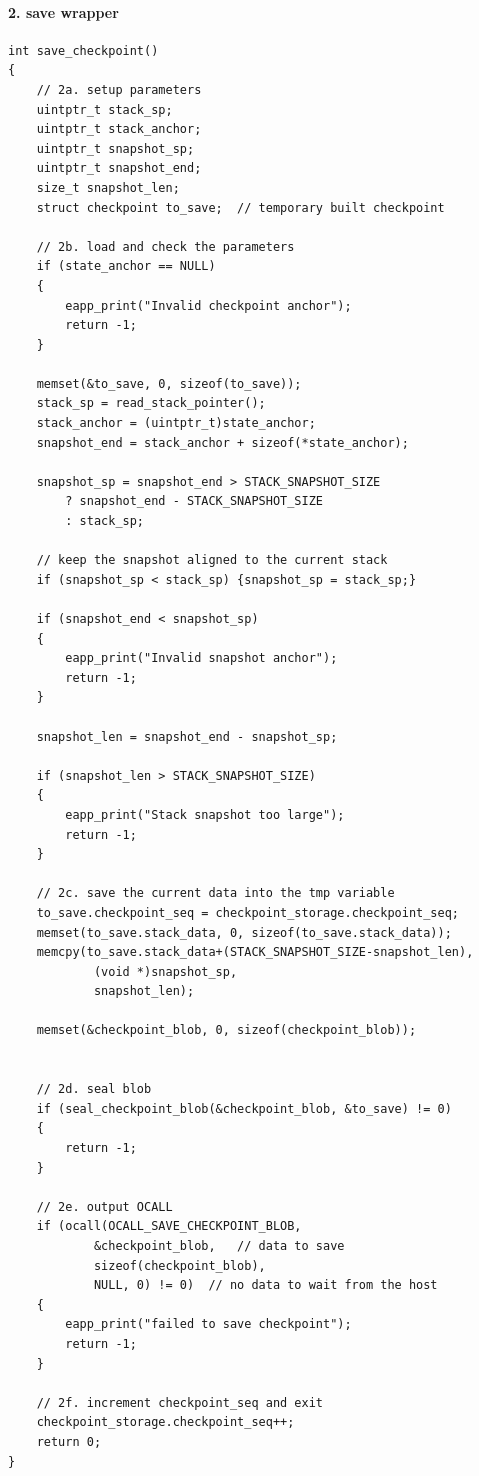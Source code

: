 \documentclass[11pt,a4paper]{report}
\begin{document}
\paragraph{2. save wrapper}
\begin{verbatim}
int save_checkpoint()
{
    // 2a. setup parameters
    uintptr_t stack_sp;
    uintptr_t stack_anchor;
    uintptr_t snapshot_sp;
    uintptr_t snapshot_end;
    size_t snapshot_len;
    struct checkpoint to_save;  // temporary built checkpoint

    // 2b. load and check the parameters
    if (state_anchor == NULL)
    {
        eapp_print("Invalid checkpoint anchor");
        return -1;
    }

    memset(&to_save, 0, sizeof(to_save));
    stack_sp = read_stack_pointer();
    stack_anchor = (uintptr_t)state_anchor;
    snapshot_end = stack_anchor + sizeof(*state_anchor);

    snapshot_sp = snapshot_end > STACK_SNAPSHOT_SIZE
        ? snapshot_end - STACK_SNAPSHOT_SIZE
        : stack_sp;

    // keep the snapshot aligned to the current stack
    if (snapshot_sp < stack_sp) {snapshot_sp = stack_sp;}

    if (snapshot_end < snapshot_sp)
    {
        eapp_print("Invalid snapshot anchor");
        return -1;
    }

    snapshot_len = snapshot_end - snapshot_sp;

    if (snapshot_len > STACK_SNAPSHOT_SIZE)
    {
        eapp_print("Stack snapshot too large");
        return -1;
    }

    // 2c. save the current data into the tmp variable
    to_save.checkpoint_seq = checkpoint_storage.checkpoint_seq;
    memset(to_save.stack_data, 0, sizeof(to_save.stack_data));
    memcpy(to_save.stack_data+(STACK_SNAPSHOT_SIZE-snapshot_len),
            (void *)snapshot_sp,
            snapshot_len);

    memset(&checkpoint_blob, 0, sizeof(checkpoint_blob));


    // 2d. seal blob
    if (seal_checkpoint_blob(&checkpoint_blob, &to_save) != 0)
    {
        return -1;
    }

    // 2e. output OCALL
    if (ocall(OCALL_SAVE_CHECKPOINT_BLOB, 
            &checkpoint_blob,   // data to save
            sizeof(checkpoint_blob), 
            NULL, 0) != 0)  // no data to wait from the host
    {
        eapp_print("failed to save checkpoint");
        return -1;
    }

    // 2f. increment checkpoint_seq and exit
    checkpoint_storage.checkpoint_seq++;
    return 0;
}
\end{verbatim}
\end{document}
